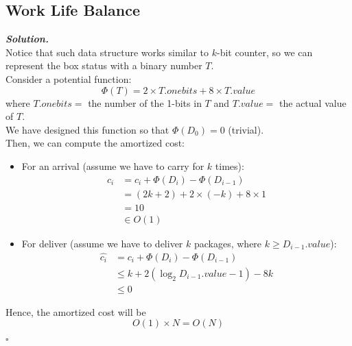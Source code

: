 \documentclass[12pt, a4paper, UTF8]{article}
\newenvironment{solution}[1][\it{Solution}]{\textbf{#1. }\\}{\begin{flushright}$\square$\end{flushright}}
\begin{document}
\begin{subprobs}
\subsection*{Work Life Balance}
\item
    \begin{solution}
        Notice that such data structure works similar to $k$-bit counter, so we can represent the box status with a binary number $T$.\\
        Consider a potential function: 
        $$\Phi(T) = 2 \times T.onebits + 8 \times T.value$$
        where $T.onebits = $ the number of the 1-bits in $T$ and $T.value = $ the actual value of $T$.\\
        We have designed this function so that $\Phi(D_0) = 0$ (trivial).\\
        Then, we can compute the amortized cost:\\ 
        \begin{itemize} 
            \item For an arrival (assume we have to carry for $k$ times):
                $$\begin{aligned}
                    \hat{c_i} & = c_i + \Phi(D_i) - \Phi(D_{i - 1})\\
                              & = (2k + 2) + 2 \times (-k) + 8 \times 1\\
                              & = 10\\
                              & \in O(1)
                \end{aligned}$$
            \item For deliver (assume we have to deliver $k$ packages, where $k \ge D_{i - 1}.value$):
                $$\begin{aligned}
                    \hat{c_i} & = c_i + \Phi(D_i) - \Phi(D_{i - 1})\\
                              & \le k + 2(\log_2{D_{i - 1}.value} - 1) - 8k\\
                              & \le 0
                \end{aligned}$$
        \end{itemize}
        Hence, the amortized cost will be
        $$O(1) \times N = O(N)$$
    \end{solution}
\end{subprobs}
\end{document}
